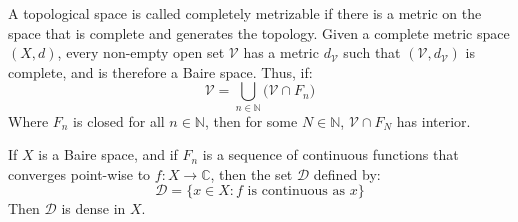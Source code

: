     A topological space is called completely metrizable if there
    is a metric on the space that is complete and generates the
    topology. Given a complete metric space $(X,d)$, every
    non-empty open set $\mathcal{V}$ has a metric
    $d_{\mathcal{V}}$ such that $(\mathcal{V},d_{\mathcal{V}})$
    is complete, and is therefore a Baire space. Thus, if:
    \begin{equation}
        \mathcal{V}=\bigcup_{n\in\mathbb{N}}\Big(
            \mathcal{V}\cap{F}_{n}\Big)
    \end{equation}
    Where $F_{n}$ is closed for all $n\in\mathbb{N}$, then
    for some $N\in\mathbb{N}$, $\mathcal{V}\cap{F}_{N}$ has
    interior.
    \begin{theorem}
    If $X$ is a Baire space, and if
    $F_{n}$ is a sequence of continuous functions that
    converges point-wise to $f:X\rightarrow\mathbb{C}$, then
    the set $\mathcal{D}$ defined by:
    \begin{equation}
        \mathcal{D}=
            \{x\in{X}:\textrm{$f$ is continuous as $x$}\}
    \end{equation}
    Then $\mathcal{D}$ is dense in $X$.
\end{theorem}
